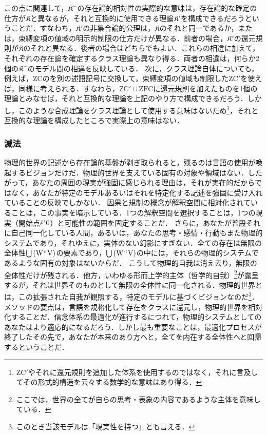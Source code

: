 この点に関連して，$\mathfrak{K}^{-}$の存在論的相対性の実際的な意味は，存在論的な確定の仕方が$\mathfrak{K}$と異なるが，それと互換的に使用できる理論$\mathfrak{K}'$を構成できるだろうということだ．すなわち，$\mathfrak{K}'$の非集合論的公理は，$\mathfrak{K}$のそれと同一であるか，または，束縛変項の値域の明示的制限の仕方だけが異なる．前者の場合，$\mathfrak{K}'$の還元規則が$\mathfrak{K}$のそれと異なる．後者の場合はどちらでもよい．これらの相違に加えて，それぞれの存在論を確定するクラス理論も異なり得る．両者の相違は，何らか2個の$\mathfrak{K}^{-}$のモデル間の相違を反映している．
次に，クラス理論自体についても，例えば，$\mathrm{ZC}$の\kagi{$ \in $}を別の述語記号に交換して，束縛変項の値域も制限した$\mathrm{ZC}'$を使えば，同様に考えられる．すなわち，$\mathrm{ZC}'\cup\mathrm{ZFC}$に還元規則を加えたものを1個の理論とみなせば，それと互換的な理論を上記のやり方で構成できるだろう．しかし，このような合成理論をクラス理論として使用する意味はないため\footnote{
    $\mathrm{ZC}'$やそれに還元規則を追加した体系を使用するのではなく，それに言及してその形式的構造を云々する数学的な意味はあり得る．
}，それと互換的な理論を構成したところで実際上の意味はない．

\subsubsection{滅法}
\label{sssec:滅法}

物理的世界の記述から存在論的基盤が剥ぎ取られると，残るのは言語の使用が喚起するビジョンだけだ．物理的世界を支えている固有の対象や領域はない．したがって，あなたの周囲の現実が強固に感じられる理由は，それが実在的だからではなく，あなたが特定のモデルあるいはそれを特定化する記述を強固に受け入れていることの反映でしかない．
因果と規制の概念が解釈空間に相対化されていることは，この事実を暗示している．1つの解釈空間を選択することは，1つの現実（開始点$ \breve{\epsilon}{\mspace{1mu}{`}\mspace{1mu}} 0 $）と可能性の範囲を固定することだ．
さらに，あなたが普段それに自己同一化している人間，あるいは，あなたの思考・感情・行動もまた物理的システムであり，それゆえに，実体のない幻影にすぎない．全ての存在は無限の全体性${\textstyle\bigcup}\mspace{3mu}(\mathrm{W}{\mspace{1mu}{``}\mspace{1mu}}\mathrm{V})$の要素であり，${\textstyle\bigcup}\mspace{3mu}(\mathrm{W}{\mspace{1mu}{``}\mspace{1mu}}\mathrm{V})$の中には，それらの物理的システムであるような固有の対象はないからだ．
こうして物理的自我は消え去り，無限の全体性だけが残される．他方，いわゆる形而上学的主体（哲学的自我）\footnote{ここでは，世界の全てが自らの思考・表象の内容であるような主体を意味している．}が露呈するが，それは世界そのものとして無限の全体性に同一化される．物理的世界とは，この拡張された自我が観照する，特定のモデルに基づくビジョンなのだ\footnote{このとき当該モデルは「現実性を持つ」とも言える．}．
メソッドの要点は，言語を規格化して存在をクラスに還元し，物理的世界を相対化することだ．信念体系の最適化が進行するにつれて，物理的システムとしてのあなたはより適応的になるだろう．しかし最も重要なことは，最適化プロセスが終了したその先で，あなたが本来のあり方へと，全てを内在する全体性へと回帰するということだ．

